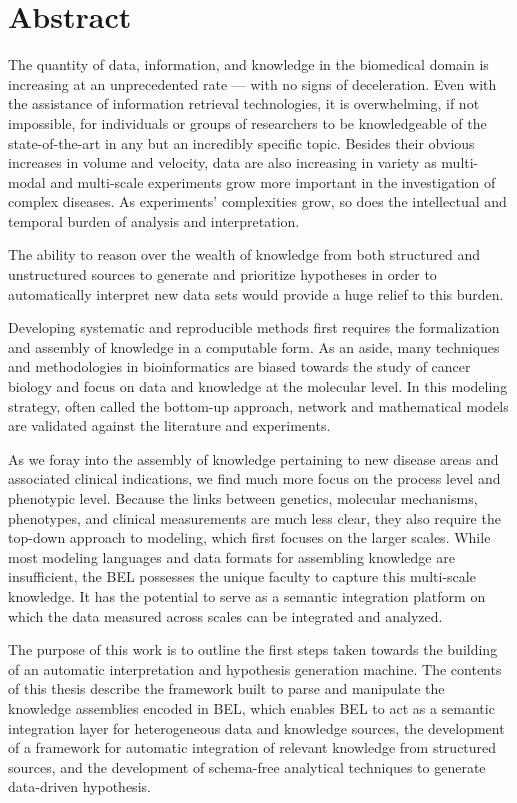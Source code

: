 \chapter*{Abstract}
The quantity of data, information, and knowledge in the biomedical domain is increasing at an unprecedented rate — with no signs of deceleration. Even with the assistance of information retrieval technologies, it is overwhelming, if not impossible, for individuals or groups of researchers to be knowledgeable of the state-of-the-art in any but an incredibly specific topic. Besides their obvious increases in volume and velocity, data are also increasing in variety as multi-modal and multi-scale experiments grow more important in the investigation of complex diseases. As experiments' complexities grow, so does the intellectual and temporal burden of analysis and interpretation. 

The ability to reason over the wealth of knowledge from both structured and unstructured sources to generate and prioritize hypotheses in order to automatically interpret new data sets would provide a huge relief to this burden. 

Developing systematic and reproducible methods first requires the formalization and assembly of knowledge in a computable form. As an aside, many techniques and methodologies in bioinformatics are biased towards the study of cancer biology and focus on data and knowledge at the molecular level. In this modeling strategy, often called the bottom-up approach, network and mathematical models are validated against the literature and experiments. 

As we foray into the assembly of knowledge pertaining to new disease areas and associated clinical indications, we find much more focus on the process level and phenotypic level. Because the links between genetics, molecular mechanisms, phenotypes, and clinical measurements are much less clear, they also require the top-down approach to modeling, which first focuses on the larger scales.  While most modeling languages and data formats for assembling knowledge are insufficient, the \ac{BEL} possesses the unique faculty to capture this multi-scale knowledge. It has the potential to serve as a semantic integration platform on which the data measured across scales can be integrated and analyzed. 

The purpose of this work is to outline the first steps taken towards the building of an automatic interpretation and hypothesis generation machine. The contents of this thesis describe the framework built to parse and manipulate the knowledge assemblies encoded in \ac{BEL}, which enables \ac{BEL} to act as a semantic integration layer for heterogeneous data and knowledge sources, the development of a framework for automatic integration of relevant knowledge from structured sources, and the development of schema-free analytical techniques to generate data-driven hypothesis.
